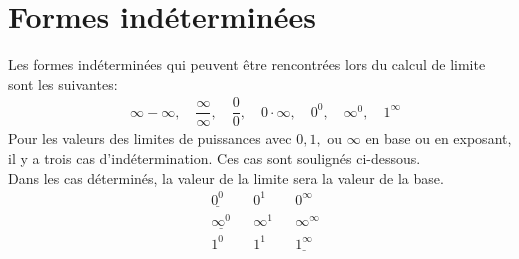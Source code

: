 \documentclass{article}
\numberwithin{equation}{section}
\begin{document}
\section{Formes indéterminées}
Les formes indéterminées qui peuvent être rencontrées lors du calcul de limite sont les suivantes:
\begin{align*}
	&\infty - \infty, \quad \dfrac{\infty}{\infty}, \quad \dfrac{0}{0}, \quad 0 \cdot \infty, \quad 0^0, \quad \infty^0, \quad 1^\infty
\end{align*}
Pour les valeurs des limites de puissances avec \(0, 1, \text{ ou } \infty\) en base ou en exposant, il y a trois cas d'indétermination. Ces cas sont soulignés ci-dessous. \\ Dans les cas déterminés, la valeur de la limite sera la valeur de la base.
\begin{align*}
	&\underline{0^0	}		& &0^1					& &0^\infty \\
	&\underline{\infty^0}	& &\infty^1				& &\infty^\infty \\
	&1^0						& &1^1					& &\underline{1^\infty}
\end{align*}
\end{document}
